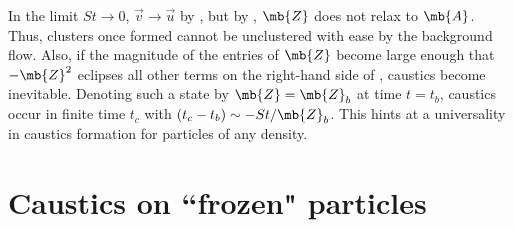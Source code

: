 In the limit $St \to 0$, $\vec{v} \to \vec{u}$ by ,  but by , $\mb{Z}$ does not relax to $\mb{A}$. Thus, clusters once formed cannot be unclustered with ease by the background flow. Also, if the magnitude of the entries of $\mb{Z}$ become large enough that $-\mb{Z}^2$ eclipses all other terms on the right-hand side of , caustics become inevitable. Denoting such a state by $\mb{Z} = \mb{Z}_b$ at time $t=t_b$, caustics occur in finite time {$t_c$ with $(t_c -t_b) \sim -St/\mb{Z}_b$}. This hints at a universality in caustics formation for particles of any density. 



\section{Caustics on ``frozen" particles}
\label{sec:caus_cond}

